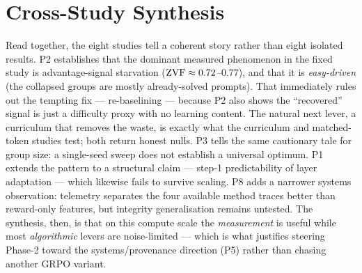 \section{Cross-Study Synthesis}
Read together, the eight studies tell a coherent story rather than eight isolated
results. P2 establishes that the dominant measured phenomenon in the fixed study is
advantage-signal starvation
($\mathrm{ZVF}\approx0.72$--$0.77$), and that it is \emph{easy-driven} (the collapsed groups
are mostly already-solved prompts). That immediately rules out the tempting fix ---
re-baselining --- because P2 also shows the ``recovered'' signal is just a difficulty
proxy with no learning content. The natural next lever, a curriculum that removes the
waste, is exactly what the curriculum and matched-token studies test; both return
honest nulls. P3 tells the same cautionary tale for group size: a single-seed sweep
does not establish a universal optimum. P1 extends
the pattern to a structural claim --- step-1 predictability of layer adaptation ---
which likewise fails to survive scaling. P8 adds a narrower systems observation:
telemetry separates the four available method traces better than reward-only features,
but integrity generalisation remains untested. The synthesis, then, is that on this
compute scale the \emph{measurement} is useful while most
\emph{algorithmic} levers are noise-limited --- which is what justifies steering
Phase-2 toward the systems/provenance direction (P5) rather than chasing another
GRPO variant.

